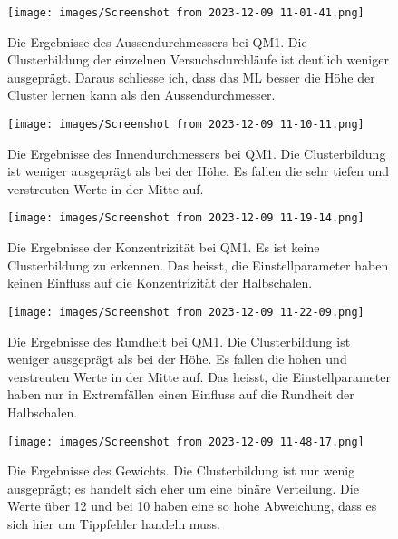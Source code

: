 \begin{figure}
   
  \texttt{[image: images/Screenshot from 2023-12-09 11-01-41.png]}
  \caption{Die Ergebnisse des Aussendurchmessers bei QM1. Die Clusterbildung der einzelnen Versuchsdurchläufe ist deutlich weniger ausgeprägt. Daraus schliesse ich, dass das ML besser die Höhe der Cluster lernen kann als den Aussendurchmesser.
}
  \label{fig:AlleWerteKleinerDoEAusen}
\end{figure}


\begin{figure}
   
  \texttt{[image: images/Screenshot from 2023-12-09 11-10-11.png]}
  \caption{Die Ergebnisse des Innendurchmessers bei QM1. Die Clusterbildung ist weniger ausgeprägt als bei der Höhe. Es fallen die sehr tiefen und verstreuten Werte in der Mitte auf.}
  \label{fig:AlleWerteKleinerDoEInnen}
\end{figure}



\begin{figure}
   
  \texttt{[image: images/Screenshot from 2023-12-09 11-19-14.png]}
  \caption{Die Ergebnisse der Konzentrizität bei QM1. Es ist keine Clusterbildung zu erkennen. Das heisst, die Einstellparameter haben keinen Einfluss auf die Konzentrizität der Halbschalen.}
  \label{fig:AlleWerteKleinerDoEKon}
\end{figure}



\begin{figure}
   
  \texttt{[image: images/Screenshot from 2023-12-09 11-22-09.png]}
  \caption{Die Ergebnisse des Rundheit bei QM1. Die Clusterbildung ist weniger ausgeprägt als bei der Höhe. Es fallen die hohen und verstreuten Werte in der Mitte auf. Das heisst, die Einstellparameter haben nur in Extremfällen einen Einfluss auf die Rundheit der Halbschalen.}
  \label{fig:AlleWerteKleinerDoERund}
\end{figure}



\begin{figure}
   
  \texttt{[image: images/Screenshot from 2023-12-09 11-48-17.png]}
  \caption{Die Ergebnisse des Gewichts. Die Clusterbildung ist nur wenig ausgeprägt; es handelt sich eher um eine binäre Verteilung. Die Werte über 12 und bei 10 haben eine so hohe Abweichung, dass es sich hier um Tippfehler handeln muss.
}
  \label{fig:AlleWerteKleinerDoEGew}
\end{figure}



